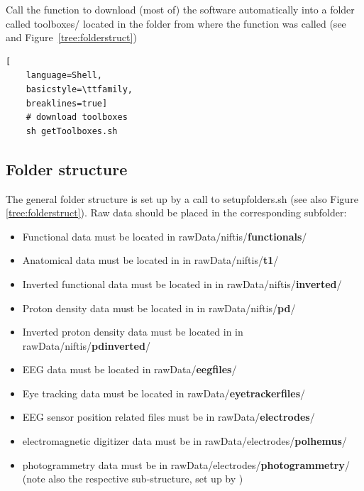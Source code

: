 \documentclass[12pt,a4paper]{scrartcl}
\begin{document}
\noindent Call the function \texttt{} to download (most of) the software automatically into a folder called toolboxes/ located in the folder from where the function was called (see \texttt{} and Figure~\ref{tree:folderstruct})\\
\begin{lstlisting}[
    language=Shell,
    basicstyle=\ttfamily,
    breaklines=true]
    # download toolboxes
    sh getToolboxes.sh
\end{lstlisting}

\subsection{Folder structure}
\label{sec:dirstruct}
The general folder structure is set up by a call to setupfolders.sh (see also Figure \ref{tree:folderstruct}). Raw data should be placed in the corresponding subfolder:
\begin{itemize}
\item Functional data must be located in rawData/niftis/\textbf{functionals}/
\item Anatomical data must be located in in rawData/niftis/\textbf{t1}/
\item Inverted functional data must be located in in rawData/niftis/\textbf{inverted}/
\item Proton density data must be located in in rawData/niftis/\textbf{pd}/
\item Inverted proton density data must be located in in rawData/niftis/\textbf{pdinverted}/
\item EEG data must be located in rawData/\textbf{eegfiles}/
\item Eye tracking data must be located in rawData/\textbf{eyetrackerfiles}/
\item EEG sensor position related files must be in rawData/\textbf{electrodes}/
\item electromagnetic digitizer data must be in rawData/electrodes/\textbf{polhemus}/
\item photogrammetry data must be in rawData/electrodes/\textbf{photogrammetry}/ (note also the respective sub-structure, set up by \texttt{})
\end{itemize}
\end{document}
